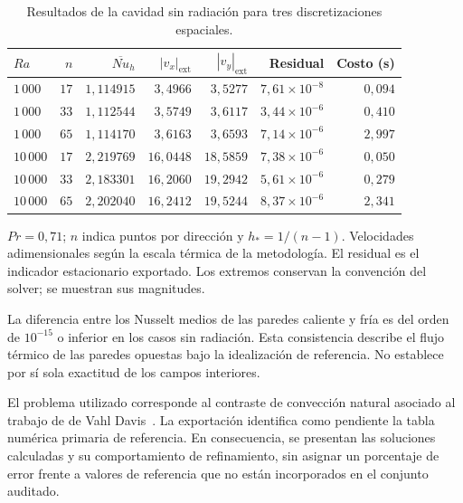 \begin{table}[htbp]
\centering
\caption{Resultados de la cavidad sin radiación para tres discretizaciones espaciales.}
\label{tab:res_cavidad_espacial}
\small
\setlength{\tabcolsep}{5pt}
\begin{tabular}{lrrrrrr}
\toprule
$Ra$ & $n$ & $\overline{Nu}_h$ & $|v_x|_{\mathrm{ext}}$ & $|v_y|_{\mathrm{ext}}$ & Residual & Costo (s) \\
\midrule
$1\,000$ & $17$ & $1{,}114915$ & $3{,}4966$ & $3{,}5277$ & $7{,}61\times10^{-8}$ & $0{,}094$ \\
$1\,000$ & $33$ & $1{,}112544$ & $3{,}5749$ & $3{,}6117$ & $3{,}44\times10^{-6}$ & $0{,}410$ \\
$1\,000$ & $65$ & $1{,}114170$ & $3{,}6163$ & $3{,}6593$ & $7{,}14\times10^{-6}$ & $2{,}997$ \\
$10\,000$ & $17$ & $2{,}219769$ & $16{,}0448$ & $18{,}5859$ & $7{,}38\times10^{-6}$ & $0{,}050$ \\
$10\,000$ & $33$ & $2{,}183301$ & $16{,}2060$ & $19{,}2942$ & $5{,}61\times10^{-6}$ & $0{,}279$ \\
$10\,000$ & $65$ & $2{,}202040$ & $16{,}2412$ & $19{,}5244$ & $8{,}37\times10^{-6}$ & $2{,}341$ \\
\bottomrule
\end{tabular}
\par\vspace{3pt}
\begin{minipage}{0.98\textwidth}\footnotesize
$Pr=0{,}71$; $n$ indica puntos por dirección y $h_*=1/(n-1)$. Velocidades adimensionales según la escala térmica de la metodología. El residual es el indicador estacionario exportado. Los extremos conservan la convención del solver; se muestran sus magnitudes.
\end{minipage}
\end{table}


La diferencia entre los Nusselt medios de las paredes caliente y fría es del orden de $10^{-15}$ o inferior en los casos sin radiación. Esta consistencia describe el flujo térmico de las paredes opuestas bajo la idealización de referencia. No establece por sí sola exactitud de los campos interiores.

El problema utilizado corresponde al contraste de convección natural asociado al trabajo de de Vahl Davis~\cite{devahl1983}. La exportación identifica como pendiente la tabla numérica primaria de referencia. En consecuencia, se presentan las soluciones calculadas y su comportamiento de refinamiento, sin asignar un porcentaje de error frente a valores de referencia que no están incorporados en el conjunto auditado.

